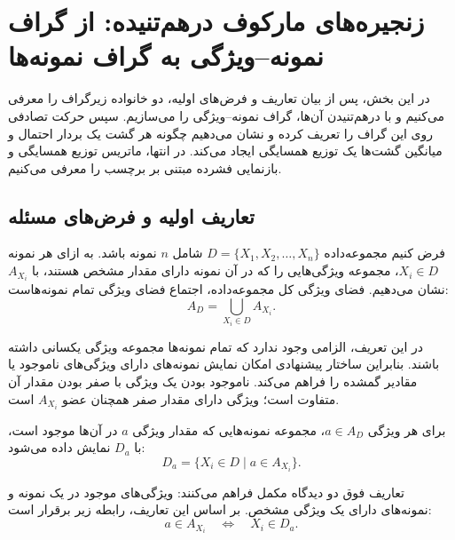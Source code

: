 \section{زنجیره‌های مارکوف درهم‌تنیده: از گراف نمونه--ویژگی به گراف نمونه‌ها}
\label{cmp:sec:ch3-interwoven}
در این بخش، پس از بیان تعاریف و فرض‌های اولیه، دو خانواده زیرگراف را معرفی می‌کنیم و با درهم‌تنیدن آن‌ها، گراف نمونه--ویژگی را می‌سازیم. سپس حرکت تصادفی روی این گراف را تعریف کرده و نشان می‌دهیم چگونه هر گشت یک بردار احتمال و میانگین گشت‌ها یک توزیع همسایگی ایجاد می‌کند. در انتها، ماتریس توزیع همسایگی و بازنمایی فشرده مبتنی بر برچسب را معرفی می‌کنیم.

\subsection{تعاریف اولیه و فرض‌های مسئله}
\label{cmp:subsec:ch3-definitions}

\begin{definition}
فرض کنیم مجموعه‌داده $D=\{X_1,X_2,\ldots,X_n\}$ شامل $n$ نمونه باشد. به ازای هر نمونه $X_i\in D$، مجموعه ویژگی‌هایی را که در آن نمونه دارای مقدار مشخص هستند، با $A_{X_i}$ نشان می‌دهیم. فضای ویژگی کل مجموعه‌داده، اجتماع فضای ویژگی تمام نمونه‌هاست:
\begin{equation}\label{cmp:eq:ch3-feature-space}
A_D=\bigcup_{X_i\in D}A_{X_i}.
\end{equation}
\end{definition}
در این تعریف، الزامی وجود ندارد که تمام نمونه‌ها مجموعه ویژگی یکسانی داشته باشند. بنابراین ساختار پیشنهادی امکان نمایش نمونه‌های دارای ویژگی‌های ناموجود یا مقادیر گمشده را فراهم می‌کند. ناموجود بودن یک ویژگی با صفر بودن مقدار آن متفاوت است؛ ویژگی دارای مقدار صفر همچنان عضو $A_{X_i}$ است.

\begin{definition}
برای هر ویژگی $a\in A_D$، مجموعه نمونه‌هایی که مقدار ویژگی $a$ در آن‌ها موجود است، با $D_a$ نمایش داده می‌شود:
\begin{equation}\label{cmp:eq:ch3-feature-samples}
D_a=\bigl\{X_i\in D\mid a\in A_{X_i}\bigr\}.
\end{equation}
\end{definition}
تعاریف فوق دو دیدگاه مکمل فراهم می‌کنند: ویژگی‌های موجود در یک نمونه و نمونه‌های دارای یک ویژگی مشخص. بر اساس این تعاریف، رابطه زیر برقرار است:
\begin{equation}\label{cmp:eq:ch3-incidence}
a\in A_{X_i}\quad\Longleftrightarrow\quad X_i\in D_a.
\end{equation}

